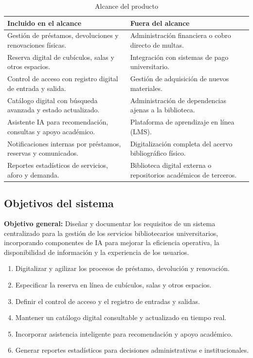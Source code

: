 \documentclass[12pt,journal,onecolumn]{IEEEtran}
\begin{document}
\begin{table}[H]\centering
\caption{Alcance del producto}
\begin{tabularx}{\textwidth}{Y Y}\toprule
\textbf{Incluido en el alcance} & \textbf{Fuera del alcance}\\\midrule
Gestión de préstamos, devoluciones y renovaciones físicas. & Administración financiera o cobro directo de multas.\\
Reserva digital de cubículos, salas y otros espacios. & Integración con sistemas de pago universitario.\\
Control de acceso con registro digital de entrada y salida. & Gestión de adquisición de nuevos materiales.\\
Catálogo digital con búsqueda avanzada y estado actualizado. & Administración de dependencias ajenas a la biblioteca.\\
Asistente IA para recomendación, consultas y apoyo académico. & Plataforma de aprendizaje en línea (LMS).\\
Notificaciones internas por préstamos, reservas y comunicados. & Digitalización completa del acervo bibliográfico físico.\\
Reportes estadísticos de servicios, aforo y demanda. & Biblioteca digital externa o repositorios académicos de terceros.\\\bottomrule
\end{tabularx}
\end{table}

\subsection{Objetivos del sistema}
\textbf{Objetivo general:} Diseñar y documentar los requisitos de un sistema centralizado para la gestión de los servicios bibliotecarios universitarios, incorporando componentes de IA para mejorar la eficiencia operativa, la disponibilidad de información y la experiencia de los usuarios.

\begin{enumerate}[label=OBJ-\arabic*]
\item Digitalizar y agilizar los procesos de préstamo, devolución y renovación.
\item Especificar la reserva en línea de cubículos, salas y otros espacios.
\item Definir el control de acceso y el registro de entradas y salidas.
\item Mantener un catálogo digital consultable y actualizado en tiempo real.
\item Incorporar asistencia inteligente para recomendación y apoyo académico.
\item Generar reportes estadísticos para decisiones administrativas e institucionales.
\end{enumerate}
\end{document}
